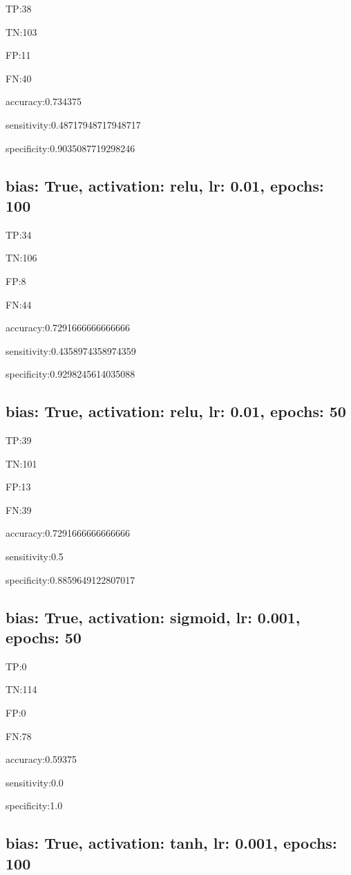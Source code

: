 \documentclass{article}
\begin{document}
TP:38

TN:103

FP:11

FN:40

accuracy:0.734375

sensitivity:0.48717948717948717

specificity:0.9035087719298246



\subsection{bias: True, activation: relu, lr: 0.01, epochs: 100}

TP:34

TN:106

FP:8

FN:44

accuracy:0.7291666666666666

sensitivity:0.4358974358974359

specificity:0.9298245614035088



\subsection{bias: True, activation: relu, lr: 0.01, epochs: 50}

TP:39

TN:101

FP:13

FN:39

accuracy:0.7291666666666666

sensitivity:0.5

specificity:0.8859649122807017



\subsection{bias: True, activation: sigmoid, lr: 0.001, epochs: 50}

TP:0

TN:114

FP:0

FN:78

accuracy:0.59375

sensitivity:0.0

specificity:1.0



\subsection{bias: True, activation: tanh, lr: 0.001, epochs: 100}
\end{document}
